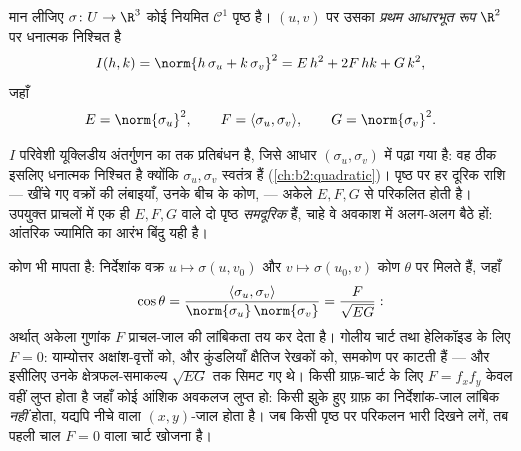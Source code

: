 \begin{definition}[प्रथम आधारभूत रूप]\label{def:b2:surfaces:fff}
मान लीजिए $\sigma \colon U \to \R^3$ कोई नियमित $\mathcal{C}^1$ पृष्ठ है। $(u,v)$ पर उसका
\emph{प्रथम आधारभूत रूप} $\R^2$ पर धनात्मक
निश्चित  है
\[
I(h, k) = \norm{h\,\sigma_u + k\,\sigma_v}^2
= E\,h^2 + 2F\,hk + G\,k^2,
\]
जहाँ
\[
E = \norm{\sigma_u}^2,
\qquad
F = \langle \sigma_u, \sigma_v\rangle,
\qquad
G = \norm{\sigma_v}^2 .
\]
\end{definition}

\begin{remark}
$I$ परिवेशी यूक्लिडीय अंतर्गुणन का  तक प्रतिबंधन है,
जिसे आधार $(\sigma_u, \sigma_v)$ में पढ़ा गया है: वह ठीक इसलिए धनात्मक
निश्चित है क्योंकि $\sigma_u, \sigma_v$ स्वतंत्र हैं
(\cref{ch:b2:quadratic})। पृष्ठ पर हर दूरिक राशि --- खींचे गए वक्रों
की लंबाइयाँ, उनके बीच के कोण,  --- अकेले $E, F, G$ से परिकलित
होती है। उपयुक्त प्राचलों में एक ही $E,
F, G$ वाले दो पृष्ठ
\emph{समदूरिक} हैं, चाहे वे अवकाश में अलग-अलग बैठे हों: आंतरिक
ज्यामिति का आरंभ बिंदु यही है।
\end{remark}

\begin{example}[निर्देशांक वक्रों के बीच के
कोण]\label{ex:b2:surfaces:coordangle}
 कोण भी मापता है: निर्देशांक वक्र $u \mapsto \sigma(u, v_0)$ और $v \mapsto
\sigma(u_0, v)$
कोण $\theta$ पर मिलते हैं, जहाँ
\[
\cos\theta = \frac{\langle\sigma_u,
\sigma_v\rangle}{\norm{\sigma_u}\,\norm{\sigma_v}}
= \frac{F}{\sqrt{EG}} :
\]
अर्थात् अकेला गुणांक $F$ प्राचल-जाल की लांबिकता तय कर देता है।
गोलीय चार्ट तथा हेलिकॉइड के लिए $F =
0$: याम्योत्तर अक्षांश-वृत्तों
को, और कुंडलियाँ क्षैतिज रेखकों को, समकोण पर काटती हैं --- और इसीलिए
उनके क्षेत्रफल-समाकल्य $\sqrt{EG}$ तक सिमट गए थे। किसी ग्राफ़-चार्ट के
लिए $F = f_xf_y$ केवल वहीं लुप्त होता है जहाँ कोई आंशिक अवकलज लुप्त हो:
किसी झुके हुए ग्राफ़ का निर्देशांक-जाल लांबिक \emph{नहीं} होता, यद्यपि
नीचे वाला $(x, y)$-जाल होता है। जब किसी पृष्ठ पर परिकलन भारी दिखने
लगें, तब पहली चाल $F = 0$ वाला चार्ट खोजना है।
\end{example}


